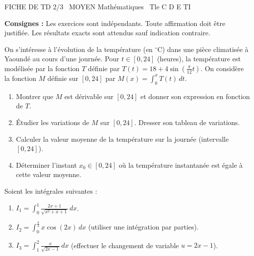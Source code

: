 \documentclass[11pt]{article}
\begin{document}
\begin{tcolorbox}[enhanced,colback=popink,colframe=popink,arc=10pt,boxrule=0pt,left=12pt,right=12pt,top=9pt,bottom=9pt]
{\color{white}\popxbold\small FICHE DE TD 2/3 \textbullet\ MOYEN \hfill Mathématiques \textbullet\ Tle C D E TI\par}
\end{tcolorbox}
\vspace{4pt}
\noindent \textbf{Consignes :} Les exercices sont indépendants. Toute affirmation doit être justifiée. Les résultats exacts sont attendus sauf indication contraire.

\begin{exercice}
On s'intéresse à l'évolution de la température (en $^\circ$C) dans une pièce climatisée à Yaoundé au cours d'une journée. Pour $t \in [0, 24]$ (heures), la température est modélisée par la fonction $T$ définie par $T(t) = 18 + 4\sin\left(\frac{\pi}{12}t\right)$.
On considère la fonction $M$ définie sur $[0, 24]$ par $M(x) = \int_0^x T(t) \, dt$.
\begin{enumerate}
    \item Montrer que $M$ est dérivable sur $[0, 24]$ et donner son expression en fonction de $T$.
    \item Étudier les variations de $M$ sur $[0, 24]$. Dresser son tableau de variations.
    \item Calculer la valeur moyenne de la température sur la journée (intervalle $[0, 24]$).
    \item Déterminer l'instant $x_0 \in [0, 24]$ où la température instantanée est égale à cette valeur moyenne.
\end{enumerate}
\end{exercice}

\begin{exercice}
Soient les intégrales suivantes :
\begin{enumerate}
    \item $I_1 = \int_0^1 \frac{2x+1}{\sqrt{x^2+x+1}} \, dx$.
    \item $I_2 = \int_0^{\frac{\pi}{4}} x \cos(2x) \, dx$ \quad (utiliser une intégration par parties).
    \item $I_3 = \int_1^2 \frac{x}{\sqrt{2x-1}} \, dx$ \quad (effectuer le changement de variable $u = 2x-1$).
\end{enumerate}
\end{exercice}
\end{document}

